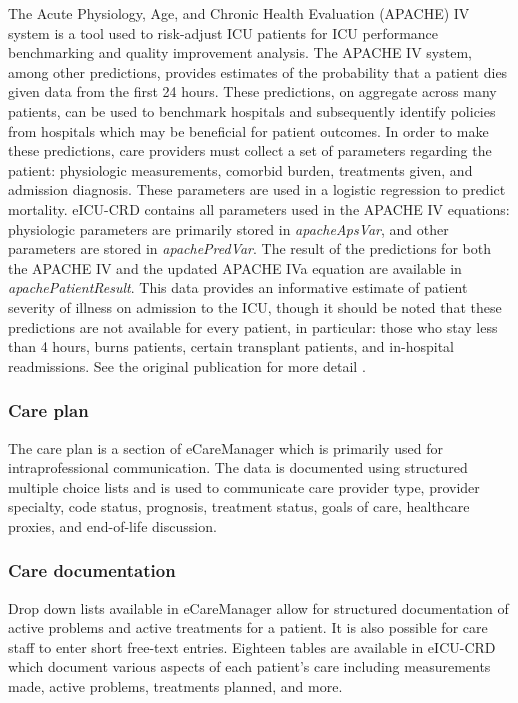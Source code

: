 \documentclass[english]{article}
\newcommand{\tblname}[1]{\emph{#1}}
\begin{document}
The Acute Physiology, Age, and Chronic Health Evaluation (APACHE) IV system
\cite{zimmerman2006acute} is a tool used to risk-adjust ICU patients
for ICU performance benchmarking and quality improvement analysis. The
APACHE IV system, among other predictions, provides estimates of the
probability that a patient dies given data from the first 24 hours.
These predictions, on aggregate across many patients, can be used to
benchmark hospitals and subsequently identify policies from hospitals
which may be beneficial for patient outcomes. In order to make these
predictions, care providers must collect a set of parameters regarding
the patient: physiologic measurements, comorbid burden, treatments
given, and admission diagnosis. These parameters are used in a logistic
regression to predict mortality. eICU-CRD contains all parameters used
in the APACHE IV equations: physiologic parameters are primarily stored
in \tblname{apacheApsVar}, and other parameters are stored in
\tblname{apachePredVar}. The result of the predictions for both the
APACHE IV and the updated APACHE IVa equation are available in
\tblname{apachePatientResult}. This data provides an informative estimate
of patient severity of illness on admission to the ICU, though it should
be noted that these predictions are not available for every patient, in
particular: those who stay less than 4 hours, burns patients, certain
transplant patients, and in-hospital readmissions. See the original
publication for more detail \cite{zimmerman2006acute}.

\subsubsection*{Care plan}\label{care-plan}

The care plan is a section of eCareManager which is primarily used for
intraprofessional communication. The data is documented using structured
multiple choice lists and is used to communicate care provider type,
provider specialty, code status, prognosis, treatment status, goals of
care, healthcare proxies, and end-of-life discussion.

\subsubsection*{Care documentation}\label{care-documentation}

Drop down lists available in eCareManager allow for structured
documentation of active problems and active treatments for a patient.
It is also possible for care staff to enter short free-text entries.
Eighteen tables are available in eICU-CRD which document various aspects of each patient's care including measurements made, active problems, treatments planned, and more.
\end{document}
